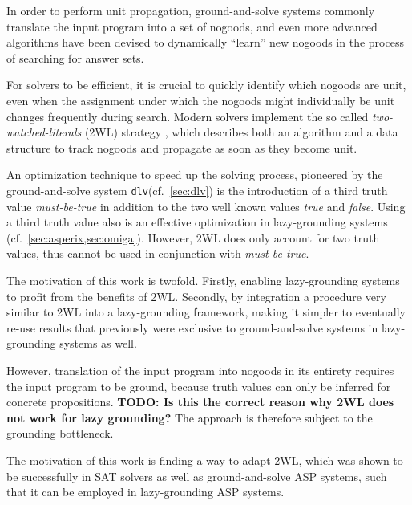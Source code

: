 \documentclass{vutinfth} %
\newcommand{\todo}[1]{{\color{red}\textbf{TODO: {#1}}}} %
\newcommand{\mbt}{must-be-true\xspace}
\newcommand{\dlv}{\texttt{dlv}\xspace}
\begin{document}
In order to perform unit propagation, ground-and-solve systems commonly translate the input program into a set of nogoods, and even more advanced algorithms have been devised to dynamically \enquote{learn} new nogoods in the process of searching for answer sets. 

For solvers to be efficient, it is crucial to quickly identify which nogoods are unit, even when the assignment under which the nogoods might individually be unit changes frequently during search. Modern solvers implement the so called \emph{two-watched-literals} (2WL) strategy \cite{effsat,questsat}, which describes both an algorithm and a data structure to track nogoods and propagate as soon as they become unit.

An optimization technique to speed up the solving process, pioneered by the ground-and-solve system \dlv (cf.~\ref{sec:dlv}) is the introduction of a third truth value \emph{\mbt} in addition to the two well known values \emph{true} and \emph{false}. Using a third truth value also is an effective optimization in lazy-grounding systems (cf.~\ref{sec:asperix,sec:omiga}). However, 2WL does only account for two truth values, thus cannot be used in conjunction with \emph{\mbt}.

The motivation of this work is twofold. Firstly, enabling lazy-grounding systems to profit from the benefits of 2WL. Secondly, by integration a procedure very similar to 2WL into a lazy-grounding framework, making it simpler to eventually re-use results that previously were exclusive to ground-and-solve systems in lazy-grounding systems as well.


However, translation of the input program into nogoods in its entirety requires the input program to be ground, because truth values can only be inferred for concrete propositions. \todo{Is this the correct reason why 2WL does not work for lazy grounding?} The approach is therefore subject to the grounding bottleneck.

The motivation of this work is finding a way to adapt 2WL, which was shown to be successfully in SAT solvers as well as ground-and-solve ASP systems, such that it can be employed in lazy-grounding ASP systems.

\end{document}
